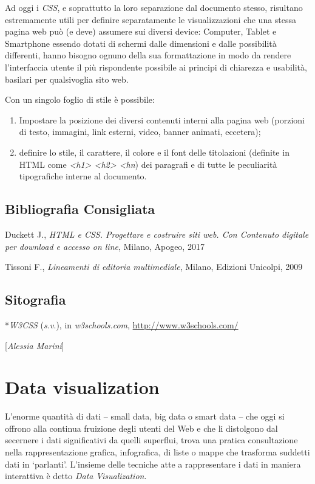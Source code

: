 Ad oggi i \emph{CSS}, e soprattutto la loro separazione dal documento
stesso, risultano estremamente utili per definire separatamente le
visualizzazioni che una stessa pagina web può (e deve) assumere sui
diversi device: Computer, Tablet e Smartphone essendo dotati di schermi
dalle dimensioni e dalle possibilità differenti, hanno bisogno ognuno
della sua formattazione in modo da rendere l'interfaccia utente il più
rispondente possibile ai principi di chiarezza e usabilità, basilari per
qualsivoglia sito web.

Con un singolo foglio di stile è possibile:

\begin{enumerate}
\def\labelenumi{\arabic{enumi}.}
\item
  Impostare la posizione dei diversi contenuti interni alla pagina web
  (porzioni di testo, immagini, link esterni, video, banner animati,
  eccetera);
\item
  definire lo stile, il carattere, il colore e il font delle titolazioni
  (definite in HTML come \emph{\textless{}h1\textgreater{}
  \textless{}h2\textgreater{} \textless{}hn}) dei
  paragrafi e di tutte le peculiarità tipografiche interne al documento.
\end{enumerate}

\section*{Bibliografia Consigliata}
{\parindent0pt 
Duckett J., \emph{HTML e CSS. Progettare e costruire siti web. Con
Contenuto digitale per download e accesso on line}, Milano, Apogeo, 2017

Tissoni F., \emph{Lineamenti di editoria multimediale}, Milano, Edizioni
Unicolpi, 2009
}

\section*{Sitografia}
{\parindent0pt 
*\emph{W3CSS} (\emph{s.v}.), in \emph{w3schools.com},
\url{http://www.w3schools.com/}
}

\hrulefill 

{[}\emph{Alessia Marini}{]}

\chapter{Data visualization}

L'enorme quantità di dati -- small data, big data o smart data -- che
oggi si offrono alla continua fruizione degli utenti del Web e che li
distolgono dal secernere i dati significativi da quelli superflui, trova
una pratica consultazione nella rappresentazione grafica, infografica,
di liste o mappe che trasforma suddetti dati in `parlanti'. L'insieme
delle tecniche atte a rappresentare i dati in maniera interattiva è
detto \emph{Data} \emph{Visualization}.

